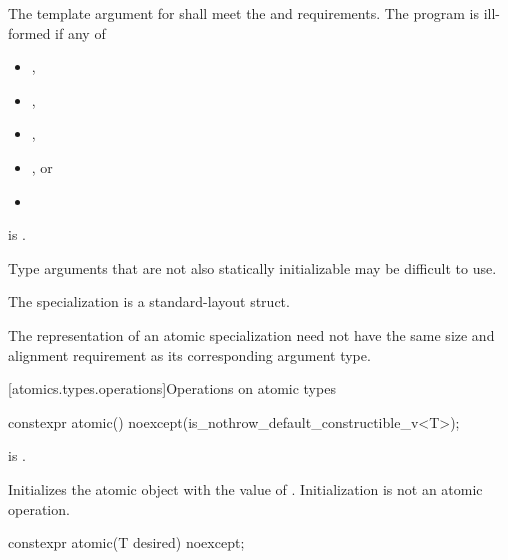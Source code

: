 %
\pnum
The template argument for  shall meet the
 and  requirements.
The program is ill-formed if any of
\begin{itemize}
\item {},
\item {},
\item {},
\item {}, or
\item {}
\end{itemize}
is .
\begin{note}
Type arguments that are
not also statically initializable may be difficult to use.
\end{note}

\pnum
The specialization  is a standard-layout struct.

\pnum
\begin{note}
The representation of an atomic specialization
need not have the same size and alignment requirement as
its corresponding argument type.
\end{note}

[atomics.types.operations]{Operations on atomic types}

%
%
%
%
\begin{itemdecl}
constexpr atomic() noexcept(is_nothrow_default_constructible_v<T>);
\end{itemdecl}

\begin{itemdescr}
\pnum
\mandates
{} is .

\pnum
\effects
Initializes the atomic object with the value of .
Initialization is not an atomic operation.
\end{itemdescr}

%
%
%
%
\begin{itemdecl}
constexpr atomic(T desired) noexcept;
\end{itemdecl}

